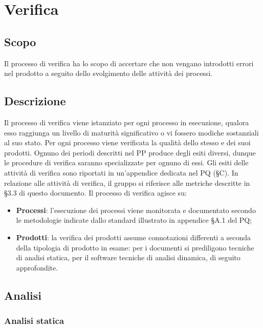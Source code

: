 \documentclass[../NormediProgetto.tex]{subfiles}
\begin{document}
	
	
	
\section{Verifica}

\subsection{Scopo}
Il processo di verifica ha lo scopo di accertare che non vengano introdotti errori nel prodotto a seguito dello svolgimento delle attività dei processi.

\subsection{Descrizione}

Il processo di verifica viene istanziato per ogni processo in esecuzione, qualora esso raggiunga un livello di maturità significativo o vi fossero modiche sostanziali al suo stato. Per ogni processo viene verificata la qualità dello stesso e dei suoi prodotti. Ognuno dei periodi descritti nel PP produce degli esiti diversi, dunque le procedure di verifica saranno specializzate per ognuno di essi. Gli esiti delle attività di
verifica sono riportati in un'appendice dedicata nel PQ (§C). 
In relazione alle attività di verifica, il gruppo si riferisce alle metriche descritte in §3.3 di questo documento. Il processo di verifica agisce su:
\begin{itemize}
	\item \textbf{Processi}: l'esecuzione dei processi viene monitorata e documentato secondo le metodologie indicate dallo standard  illustrato in appendice §A.1 del PQ;
	\item \textbf{Prodotti}: la verifica dei prodotti assume connotazioni differenti a seconda della tipologia di prodotto in esame: per i documenti si prediligono tecniche di analisi statica, per il software tecniche di analisi dinamica, di seguito approfondite.
\end{itemize}

\subsection{Analisi}

\subsubsection{Analisi statica}
\end{document}
